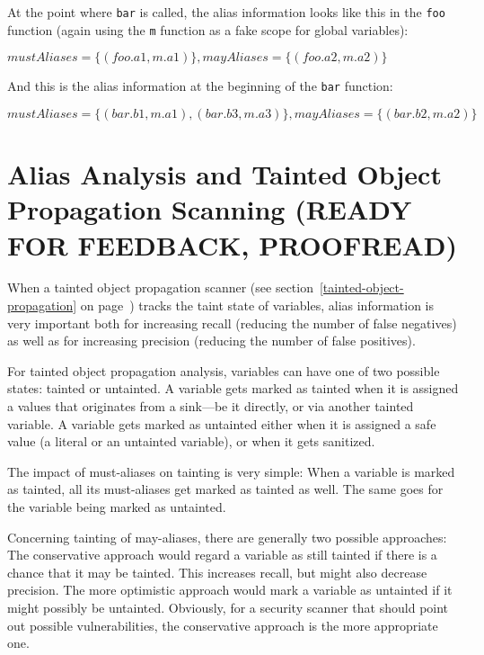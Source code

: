 At the point where \texttt{bar} is called, the alias information looks like this in the \texttt{foo} function (again using the \texttt{m} function as a fake scope for global variables):

$mustAliases = \{(foo.a1, m.a1)\}, mayAliases = \{(foo.a2, m.a2)\}$

And this is the alias information at the beginning of the \texttt{bar} function:

$mustAliases = \{(bar.b1, m.a1), (bar.b3, m.a3)\}, mayAliases = \{(bar.b2, m.a2)\}$




\section{Alias Analysis and Tainted Object Propagation Scanning (READY FOR FEEDBACK, PROOFREAD)}

When a tainted object propagation scanner (see section~\ref{tainted-object-propagation} on page~\pageref{tainted-object-propagation}) tracks the taint state of variables, alias information is very important both for increasing recall (\ie reducing the number of false negatives) as well as for increasing precision (\ie reducing the number of false positives).

For tainted object propagation analysis, variables can have one of two possible states: tainted or untainted. A variable gets marked as tainted when it is assigned a values that originates from a sink---be it directly, or via another tainted variable. A variable gets marked as untainted either when it is assigned a safe value (\eg a literal or an untainted variable), or when it gets sanitized.

The impact of must-aliases on tainting is very simple: When a variable is marked as tainted, all its must-aliases get marked as tainted as well. The same goes for the variable being marked as untainted.

Concerning tainting of may-aliases, there are generally two possible approaches: The conservative approach would regard a variable as still tainted if there is a chance that it may be tainted. This increases recall, but might also decrease precision. The more optimistic approach would mark a variable as untainted if it might possibly be untainted. Obviously, for a security scanner that should point out possible vulnerabilities, the conservative approach is the more appropriate one.


